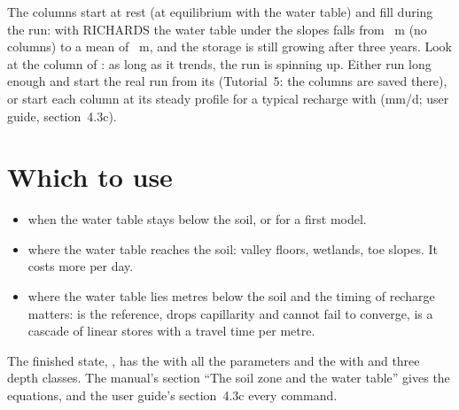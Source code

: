 
\begin{note}
The columns start at rest (at equilibrium with the water table) and fill during the run: with RICHARDS the water table under
the slopes falls from ~m (no columns) to a mean of ~m, and the storage is still
growing after three years. Look at the column  of : as long as it trends,
the run is spinning up. Either run long enough and start the real run from its  (Tutorial~5: the
columns are saved there), or start each column at its steady profile for a typical recharge with
 (mm/d; user guide, section~4.3c).
\end{note}

\section{Which to use}
\begin{itemize}
\item {} when the water table stays below the soil, or for a first model.
\item {} where the water table reaches the soil: valley floors, wetlands, toe slopes. It costs more per day.
\item {} where the water table lies metres below the soil and the timing of recharge matters:
       is the reference,  drops capillarity and cannot fail to converge,  is a cascade of
      linear stores with a travel time per metre.
\end{itemize}
The finished state, , has the  with all the parameters and the  with
 and three depth classes. The manual's section ``The soil zone and the water table'' gives the equations,
and the user guide's section~4.3c every  command.
